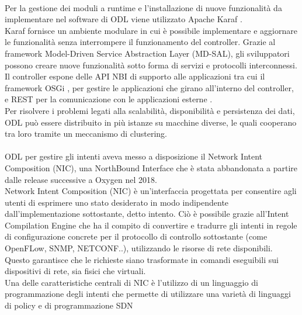 \\Per la gestione dei moduli a runtime e l'installazione di nuove funzionalità da implementare nel software di ODL viene utilizzato Apache Karaf \cite{Apache}.
\\Karaf fornisce un ambiente modulare in cui è possibile implementare e aggiornare le funzionalità senza interrompere il funzionamento del controller.
Grazie al framework Model-Driven Service Abstraction Layer (MD-SAL), gli sviluppatori possono creare nuove funzionalità sotto forma di servizi e protocolli interconnessi.
Il controller espone delle API NBI di supporto alle applicazioni tra cui il framework OSGi \cite{osgi}, per gestire le applicazioni che girano all'interno del controller,
e REST per la comunicazione con le applicazioni esterne \cite{tesiodl2}.
\\Per risolvere i problemi legati alla scalabilità, disponibilità e persistenza dei dati, ODL può essere distribuito in più istanze su macchine diverse, le quali cooperano tra loro tramite un meccanismo di clustering.
\\
\\ODL per gestire gli intenti aveva messo a disposizione il Network Intent Composition (NIC), una NorthBound Interface che è stata abbandonata a partire dalle release successive a Oxygen nel 2018.
\\Network Intent Composition (NIC) \cite{nic} è un'interfaccia progettata per consentire agli utenti di esprimere uno stato desiderato in modo indipendente dall'implementazione sottostante, detto intento. 
Ciò è possibile grazie all'Intent Compilation Engine che ha il compito di convertire e tradurre gli intenti in regole di configurazione concrete per il protocollo di controllo sottostante (come OpenFLow, SNMP, NETCONF..), utilizzando le risorse di rete disponibili.
Questo garantisce che le richieste siano trasformate in comandi eseguibili sui dispositivi di rete, sia fisici che virtuali.
\\Una delle caratteristiche centrali di NIC è l'utilizzo di un linguaggio di programmazione degli intenti che permette di utilizzare una varietà di linguaggi di policy e di programmazione SDN
